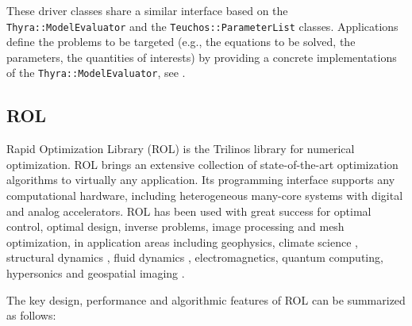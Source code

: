 These driver classes share a similar interface based on the \texttt{Thyra::ModelEvaluator} and the \texttt{Teuchos::ParameterList} classes. Applications define the problems to be targeted (e.g., the equations to be solved, the parameters, the quantities of interests) by providing a concrete implementations of the \texttt{Thyra::ModelEvaluator}, see \cite{pawlowski2012automating,pawlowski2012automatingpart2}.


\subsection{ROL}
Rapid Optimization Library (ROL) \cite{rol,ROL2022ICCOPT} is the
Trilinos library for numerical optimization. ROL brings an extensive
collection of state-of-the-art optimization algorithms to virtually
any application. Its programming interface supports any computational
hardware, including heterogeneous many-core systems with digital and
analog accelerators.
ROL has been used with great success for optimal control, optimal design,
inverse problems, image processing and mesh optimization, in application
areas including geophysics, climate science \cite{Perego2022}, structural
dynamics \cite{AQUINO2019323,BUNTING2021107295}, fluid dynamics
\cite{Antil2023}, electromagnetics, quantum computing, hypersonics and
geospatial imaging \cite{Kouri2014}.

The key design, performance and algorithmic features of ROL can be
summarized as follows:

